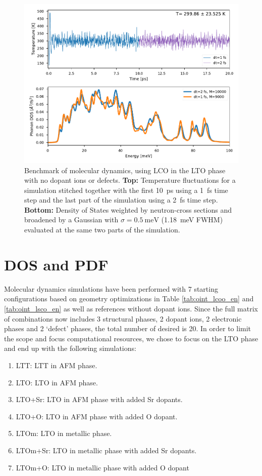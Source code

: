 \begin{figure}
	\centering
	\includegraphics[width=\textwidth]{fig/md/stitch.pdf}
	\caption[stitched md runs]{Benchmark of molecular dynamics, using LCO in the LTO phase with no dopant ions or defects. \textbf{Top:} Temperature fluctuations for a simulation stitched together with the first \SI{10}{\pico\second} using a \SI{1}{\femto\second} time step and the last part of the simulation using a \SI{2}{\femto\second} time step. \textbf{Bottom:} Density of States weighted by neutron-cross sections and broadened by a Gaussian with $\sigma=\SI{0.5}{\milli\eV}$ (\SI{1.18}{\milli\eV} FWHM) evaluated at the same two parts of the simulation.}
	\label{fig:stitch}
\end{figure}

\section{DOS and PDF}
Molecular dynamics simulations have been performed with 7 starting configurations based on geometry optimizations in Table \ref{tab:oint_lcoo_en} and \ref{tab:oint_lsco_en} as well as references without dopant ions. Since the full matrix of combinations now includes 3 structural phases, 2 dopant ions, 2 electronic phases and 2 `defect' phases, the total number of desired is 20. In order to limit the scope and focus computational resources, we chose to focus on the LTO phase and end up with the following simulations:

\begin{enumerate}
	\item LTT: LTT in AFM phase.
	\item LTO: LTO in AFM phase.
	\item LTO+Sr: LTO in AFM phase with added Sr dopants.
	\item LTO+O: LTO in AFM phase with added O dopant.
	\item LTOm: LTO in metallic phase.
	\item LTOm+Sr: LTO in metallic phase with added Sr dopants.
	\item LTOm+O: LTO in metallic phase with added O dopant
\end{enumerate}

